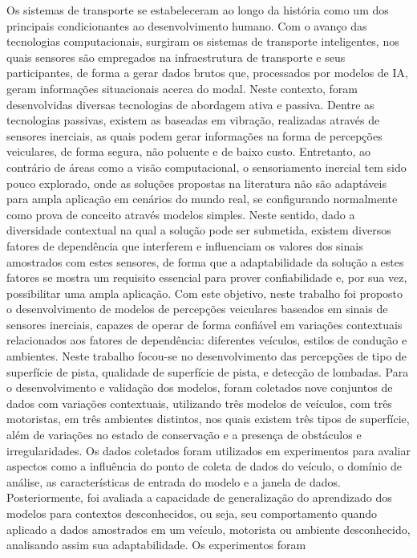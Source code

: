 
\begin{resumo}[Resumo]
    Os sistemas de transporte se estabeleceram ao longo da história como um dos principais condicionantes ao desenvolvimento humano. Com o avanço das tecnologias computacionais, surgiram os sistemas de transporte inteligentes, nos quais sensores são empregados na infraestrutura de transporte e seus participantes, de forma a gerar dados brutos que, processados por modelos de IA, geram informações situacionais acerca do modal. Neste contexto, foram desenvolvidas diversas tecnologias de abordagem ativa e passiva. Dentre as tecnologias passivas, existem as baseadas em vibração, realizadas através de sensores inerciais, as quais podem gerar informações na forma de percepções veiculares, de forma segura, não poluente e de baixo custo. Entretanto, ao contrário de áreas como a visão computacional, o sensoriamento inercial tem sido pouco explorado, onde as soluções propostas na literatura não são adaptáveis para ampla aplicação em cenários do mundo real, se configurando normalmente como prova de conceito através modelos simples. Neste sentido, dado a diversidade contextual na qual a solução pode ser submetida, existem diversos fatores de dependência que interferem e influenciam os valores dos sinais amostrados com estes sensores, de forma que a adaptabilidade da solução a estes fatores se mostra um requisito essencial para prover confiabilidade e, por sua vez, possibilitar uma ampla aplicação. Com este objetivo, neste trabalho foi proposto o desenvolvimento de modelos de percepções veiculares baseados em sinais de sensores inerciais, capazes de operar de forma confiável em variações contextuais relacionados aos fatores de dependência: diferentes veículos, estilos de condução e ambientes. Neste trabalho focou-se no desenvolvimento das percepções de tipo de superfície de pista, qualidade de superfície de pista, e detecção de lombadas. Para o desenvolvimento e validação dos modelos, foram coletados nove conjuntos de dados com variações contextuais, utilizando três modelos de veículos, com três motoristas, em três ambientes distintos, nos quais existem três tipos de superfície, além de variações no estado de conservação e a presença de obstáculos e irregularidades. Os dados coletados foram utilizados em experimentos para avaliar aspectos como a influência do ponto de coleta de dados do veículo, o domínio de análise, as características de entrada do modelo e a janela de dados. Posteriormente, foi avaliada a capacidade de generalização do aprendizado dos modelos para contextos desconhecidos, ou seja, seu comportamento quando aplicado a dados amostrados em um veículo, motorista ou ambiente desconhecido, analisando assim sua adaptabilidade. Os experimentos foram 
\end{resumo}
